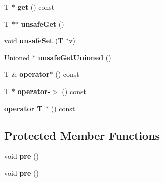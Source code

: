 \begin{DoxyCompactItemize}
\item 
\hypertarget{classjs_1_1_encapsulated_ptr_a14ca460381754f6f61ce1ffc21b59de1}{T $\ast$ {\bfseries get} () const }\label{classjs_1_1_encapsulated_ptr_a14ca460381754f6f61ce1ffc21b59de1}

\item 
\hypertarget{classjs_1_1_encapsulated_ptr_a754736eb82338433a6ca36bb7b402c70}{T $\ast$$\ast$ {\bfseries unsafe\-Get} ()}\label{classjs_1_1_encapsulated_ptr_a754736eb82338433a6ca36bb7b402c70}

\item 
\hypertarget{classjs_1_1_encapsulated_ptr_adf42e75196f1f6e45073e9adac3eee7a}{void {\bfseries unsafe\-Set} (T $\ast$v)}\label{classjs_1_1_encapsulated_ptr_adf42e75196f1f6e45073e9adac3eee7a}

\item 
\hypertarget{classjs_1_1_encapsulated_ptr_a5abd1825b4dc7a0373eb0862393cd3cc}{Unioned $\ast$ {\bfseries unsafe\-Get\-Unioned} ()}\label{classjs_1_1_encapsulated_ptr_a5abd1825b4dc7a0373eb0862393cd3cc}

\item 
\hypertarget{classjs_1_1_encapsulated_ptr_aec29d94ea09070089e2fdc73edd889ff}{T \& {\bfseries operator$\ast$} () const }\label{classjs_1_1_encapsulated_ptr_aec29d94ea09070089e2fdc73edd889ff}

\item 
\hypertarget{classjs_1_1_encapsulated_ptr_a3d06f26e68334057b5a11c561e005df4}{T $\ast$ {\bfseries operator-\/$>$} () const }\label{classjs_1_1_encapsulated_ptr_a3d06f26e68334057b5a11c561e005df4}

\item 
\hypertarget{classjs_1_1_encapsulated_ptr_a88583c2a53efd1cb4e5e488aaf1bef0a}{{\bfseries operator T $\ast$} () const }\label{classjs_1_1_encapsulated_ptr_a88583c2a53efd1cb4e5e488aaf1bef0a}

\end{DoxyCompactItemize}
\subsection*{Protected Member Functions}
\begin{DoxyCompactItemize}
\item 
\hypertarget{classjs_1_1_encapsulated_ptr_a1e11dbddab26307ac86998db5d1dfff6}{void {\bfseries pre} ()}\label{classjs_1_1_encapsulated_ptr_a1e11dbddab26307ac86998db5d1dfff6}

\item 
\hypertarget{classjs_1_1_encapsulated_ptr_a1e11dbddab26307ac86998db5d1dfff6}{void {\bfseries pre} ()}\label{classjs_1_1_encapsulated_ptr_a1e11dbddab26307ac86998db5d1dfff6}

\end{DoxyCompactItemize}
